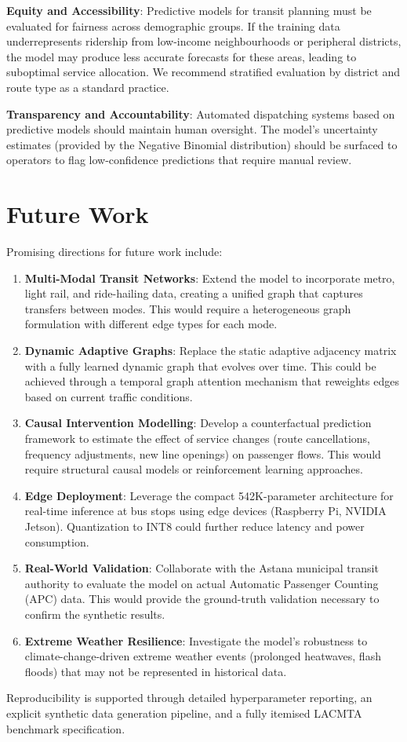 \textbf{Equity and Accessibility}: Predictive models for transit planning must be evaluated for fairness across demographic groups. If the training data underrepresents ridership from low-income neighbourhoods or peripheral districts, the model may produce less accurate forecasts for these areas, leading to suboptimal service allocation. We recommend stratified evaluation by district and route type as a standard practice.

\textbf{Transparency and Accountability}: Automated dispatching systems based on predictive models should maintain human oversight. The model's uncertainty estimates (provided by the Negative Binomial distribution) should be surfaced to operators to flag low-confidence predictions that require manual review.

\section{Future Work}
\label{sec:future}

Promising directions for future work include:

\begin{enumerate}
    \item \textbf{Multi-Modal Transit Networks}: Extend the model to incorporate metro, light rail, and ride-hailing data, creating a unified graph that captures transfers between modes. This would require a heterogeneous graph formulation with different edge types for each mode.

    \item \textbf{Dynamic Adaptive Graphs}: Replace the static adaptive adjacency matrix with a fully learned dynamic graph that evolves over time. This could be achieved through a temporal graph attention mechanism that reweights edges based on current traffic conditions.

    \item \textbf{Causal Intervention Modelling}: Develop a counterfactual prediction framework to estimate the effect of service changes (route cancellations, frequency adjustments, new line openings) on passenger flows. This would require structural causal models or reinforcement learning approaches.

    \item \textbf{Edge Deployment}: Leverage the compact 542K-parameter architecture for real-time inference at bus stops using edge devices (Raspberry Pi, NVIDIA Jetson). Quantization to INT8 could further reduce latency and power consumption.

    \item \textbf{Real-World Validation}: Collaborate with the Astana municipal transit authority to evaluate the model on actual Automatic Passenger Counting (APC) data. This would provide the ground-truth validation necessary to confirm the synthetic results.

    \item \textbf{Extreme Weather Resilience}: Investigate the model's robustness to climate-change-driven extreme weather events (prolonged heatwaves, flash floods) that may not be represented in historical data.
\end{enumerate}

Reproducibility is supported through detailed hyperparameter reporting, an explicit synthetic data generation pipeline, and a fully itemised LACMTA benchmark specification.
